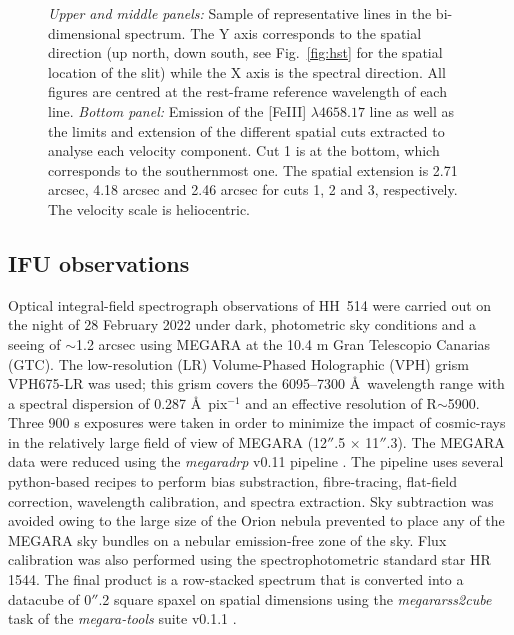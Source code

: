 \documentclass[fleqn,usenatbib]{mnras}
\begin{document}
\begin{figure}
\caption{\textit{Upper and middle panels:} Sample of representative lines in the bi-dimensional spectrum. The Y axis corresponds to the spatial direction (up north, down south, see Fig.~\ref{fig:hst} for the spatial location of the slit) while the X axis is the spectral direction. All figures are centred at the rest-frame reference wavelength of each line. \textit{Bottom panel:} Emission of the [Fe\thinspace III] $\lambda 4658.17$ line as well as the limits and extension of the different spatial cuts extracted to analyse each velocity component. Cut 1 is at the bottom, which corresponds to the southernmost one. The spatial extension is 2.71 arcsec, 4.18 arcsec and 2.46 arcsec for cuts 1, 2 and 3, respectively. The velocity scale is heliocentric.}
\label{fig:cuts}
\end{figure}

\subsection{IFU observations}
\label{sec:data_megara}

Optical integral-field spectrograph observations of HH~514 were carried out on the night of 28 February 2022 under dark, photometric sky conditions and a seeing of $\sim$1.2 arcsec using MEGARA \citep{gildepaz+18} at the 10.4 m Gran Telescopio Canarias (GTC). The low-resolution (LR) Volume-Phased Holographic (VPH) grism VPH675-LR was used; this grism covers the 6095--7300 \AA\ wavelength range  with a spectral dispersion of 0.287 \AA\ pix$^{-1}$ and an effective resolution of R$\sim$5900. Three 900 s exposures were taken in order to minimize the impact of cosmic-rays in the relatively large field of view of MEGARA (12$''$.5 $\times$ 11$''$.3). 
The MEGARA data were reduced using the {\it megaradrp} v0.11 pipeline \citep{pascual+19, pascual+20}. The pipeline uses several python-based recipes to perform bias substraction, fibre-tracing,  flat-field correction, wavelength calibration, and spectra extraction. Sky subtraction was avoided owing to the large size of the Orion nebula prevented to place any of the MEGARA sky bundles on a nebular emission-free zone of the sky. Flux calibration was also performed using the spectrophotometric standard star HR\,1544. The final product is a row-stacked spectrum that is converted into a datacube of 0$''$.2 square spaxel on spatial dimensions using the {\it megararss2cube} task of the {\it megara-tools} suite v0.1.1 \citep{gildepaz+20}. 
\end{document}
